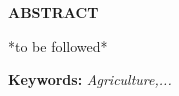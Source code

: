 \begin{center}
{\bf ABSTRACT}\\[36pt]
\end{center}
{\baselineskip

*to be followed*
}
\bigskip
\textbf{Keywords:} \textit{Agriculture,...}
